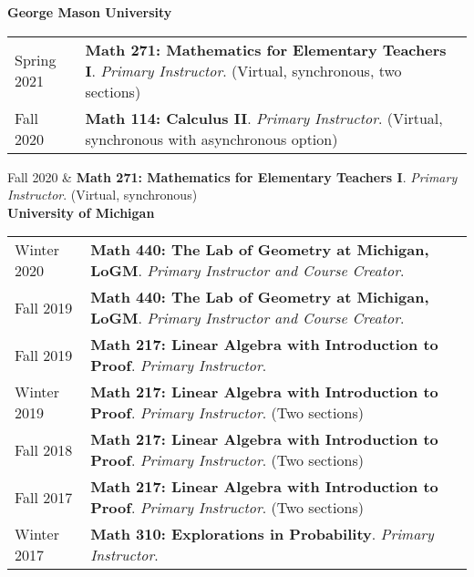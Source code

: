 
    \medskip


    \medskip
    \medskip



    \textbf{\large George Mason University}
    
    \begin{center}
    {
    \renewcommand{\arraystretch}{1.2}
    \begin{longtable}{p{}  p{}}
      Spring 2021 & \textbf{{\normalfont Math 271:} Mathematics for Elementary Teachers I}. \textit{Primary Instructor}. (Virtual, synchronous, two sections) \\ 
  Fall 2020 & \textbf{{\normalfont Math 114:} Calculus II}. \textit{Primary Instructor}. (Virtual, synchronous with asynchronous option) 
    \end{longtable}
    } 
    \end{center}

    \vspace{-1em}
      Fall 2020 & \textbf{{\normalfont Math 271:} Mathematics for Elementary Teachers I}. \textit{Primary Instructor}. (Virtual, synchronous) \\ 


    \textbf{\large University of Michigan}
    
    \begin{center}
    {
    \renewcommand{\arraystretch}{1.2}
    \begin{longtable}{p{}  p{}}
      Winter 2020 & \textbf{{\normalfont Math 440:} The Lab of Geometry at Michigan, LoGM}. \textit{Primary Instructor and Course Creator}.  \\ 
  Fall 2019 & \textbf{{\normalfont Math 440:} The Lab of Geometry at Michigan, LoGM}. \textit{Primary Instructor and Course Creator}.  \\ 
  Fall 2019 & \textbf{{\normalfont Math 217:} Linear Algebra with Introduction to Proof}. \textit{Primary Instructor}.  \\ 
  Winter 2019 & \textbf{{\normalfont Math 217:} Linear Algebra with Introduction to Proof}. \textit{Primary Instructor}. (Two sections) \\ 
  Fall 2018 & \textbf{{\normalfont Math 217:} Linear Algebra with Introduction to Proof}. \textit{Primary Instructor}. (Two sections) \\ 
  Fall 2017 & \textbf{{\normalfont Math 217:} Linear Algebra with Introduction to Proof}. \textit{Primary Instructor}. (Two sections) \\ 
  Winter 2017 & \textbf{{\normalfont Math 310:} Explorations in Probability}. \textit{Primary Instructor}.  
    \end{longtable}
    } 
    \end{center}

